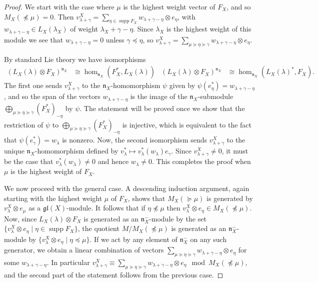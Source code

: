\documentclass[11pt,fleqn]{amsart}
\theoremstyle{definition}
\theoremstyle{remark}
\theoremstyle{remark}
\newcommand\gl{\mathfrak{gl}}
\newcommand\lie[1]{\mathfrak{#1}}
\DeclareMathOperator\supp{supp}
\begin{document}
\begin{proof}
We start with the case where $\mu$ is the highest weight vector of $F_X$, and 
so $M_X(\npreceq \mu) = 0$. Then $v^X_{\lambda+\gamma} = \sum_{\eta \in \supp 
F_X} w_{\lambda + \gamma - \eta} \otimes e_{\eta}$, with $w_{\lambda + \gamma 
- \eta} \in L_X(\lambda_X)$ of weight $\lambda_X + \gamma - \eta$. Since 
$\lambda_X$ is the highest weight of this module we see that $w_{\lambda + 
\gamma - \eta} = 0$ unless $\gamma \preceq \eta$, so $v_{\lambda + \gamma}^X = 
\sum_{\mu \succeq \eta \succeq \gamma} w_{\lambda + \gamma - \eta} \otimes e_{\eta}$.

By standard Lie theory we have isomorphisms
\begin{align*}
  (L_X(\lambda) \otimes F_X)^{\lie n_X}
    &\cong \hom_{\lie n_X}(F_X^*,L_X(\lambda))
  &(L_X(\lambda) \otimes F_X)^{\lie n_X}
    &\cong \hom_{\lie n_X}(L_X(\lambda)^*,F_X).
\end{align*}
The first one sends $v_{\lambda+\gamma}^X$ to the $\lie n_X$-homomorphism $\psi$
given by $\psi(e_{\eta}^*) = w_{\lambda+\gamma-\eta}$, and so the span of the 
vectors $w_{\lambda + \gamma - \eta}$ is the image of the $\lie n_X$-submodule 
$\bigoplus_{\mu \succeq \eta \succeq \gamma} (F_X^*)_{-\eta}$ by $\psi$. The
statement will be proved once we show that the restriction of $\psi$ to 
$\bigoplus_{\mu \succeq \eta \succeq \gamma} (F_X^*)_{-\eta}$ is injective, 
which is equivalent to the fact that 
$\psi(e_{\gamma}^*) = w_\lambda$ is nonzero. Now, the second isomorphism 
sends $v_{\lambda+ \gamma}^X$ to the unique $\lie n_X$-homomorphism defined by 
$v_{\lambda}^* \mapsto 
v_{\lambda}^*(w_{\lambda}) e_{\gamma}$. Since $v_{\lambda + \gamma}^X \neq 0$, 
it must be the case that $v_{\lambda}^*(w_{\lambda}) \neq 0$ and hence 
$w_{\lambda} \neq 0$. This completes the proof when $\mu$ is the highest weight 
of $F_X$.

We now proceed with the general case. A descending induction argument, again 
starting with the highest weight $\mu$ of $F_X$, shows that $M_X(\succeq \mu)$
is generated by $v_{\lambda}^X \otimes e_{\mu}$ as a $\gl(X)$-module. It 
follows that if $\eta \npreceq \mu$ then $v^X_{\lambda}\otimes e_{\eta} \in 
M_X(\npreceq \mu)$. Now, since $L_X(\lambda) \otimes F_X$ is generated as an 
$\lie n^-_X$-module by the set $\{v_{\lambda}^X \otimes e_{\eta} \mid \eta \in 
\supp F_X\}$, the quotient $M / M_X(\npreceq \mu)$ is generated as an $\lie 
n^-_X$-module by $\{v_{\lambda}^X \otimes e_{\eta} \mid \eta \preceq \mu\}$. If 
we act by any element of $\lie n^-_X$ on any such generator, we obtain a linear 
combination of vectors $\sum_{\mu \succeq \eta \succeq \gamma} w_{\lambda + 
\gamma - \eta} \otimes e_{\eta}$ for some $w_{\lambda + \gamma - \eta}$. 
In particular $v_{\lambda +\gamma}^X \equiv \sum_{\mu \succeq \eta \succeq 
\gamma} w_{\lambda + \gamma - \eta} \otimes e_{\eta} \mod M_X(\npreceq \mu)$, 
and the second part of the statement follows from the previous case.
\end{proof}
\end{document}
